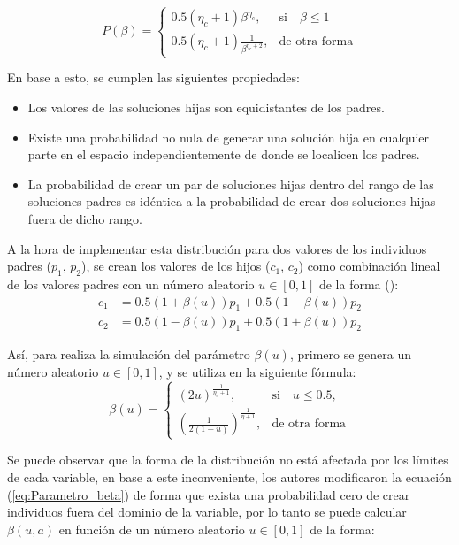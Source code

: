 \begin{equation}
    P(\beta)= 
\begin{cases}
     0.5(\eta_c + 1)\beta^{\eta_c},& \text{si} \quad \beta \leq 1\\
     0.5(\eta_c + 1) \frac{1}{\beta^{\eta_c + 2}} ,& \text{de otra forma}
\end{cases}
\end{equation}

En base a esto, se cumplen las siguientes propiedades:
\begin{itemize}
\item Los valores de las soluciones hijas son equidistantes de los padres.
\item Existe una probabilidad no nula de generar una solución hija en cualquier parte en el espacio independientemente de donde se localicen los padres.
\item La probabilidad de crear un par de soluciones hijas dentro del rango de las soluciones padres es idéntica a la probabilidad de crear dos soluciones hijas fuera de dicho rango.
\end{itemize}

A la hora de implementar esta distribución para dos valores de los individuos padres ($p_1$, $p_2$), se crean los valores  
de los hijos ($c_1$, $c_2$) como combinación lineal de los valores padres con un número aleatorio $u \in [0, 1]$ 
de la forma (\cite{Joel:SBX1994}):
\begin{equation} \label{eq:generar_ind}
\begin{split}
c_1 &= 0.5(1 + \beta(u))p_1 + 0.5(1 - \beta(u)) p_2 \\
c_2 &= 0.5(1 - \beta(u))p_1 + 0.5(1 + \beta(u)) p_2
\end{split}
\end{equation}

Así, para realiza la simulación del parámetro $\beta(u)$, primero se genera un número aleatorio $u \in [0, 1]$, y se utiliza 
en la siguiente fórmula:
\begin{equation} \label{eq:Parametro_beta}
    \beta(u)= 
\begin{cases}
     (2u)^{\frac{1}{\eta_c+1}},& \text{si} \quad u \leq 0.5,\\
     	(\frac{1}{2(1-u)})^{\frac{1}{\eta+1}} ,& \text{de otra forma}
\end{cases}
\end{equation}

Se puede observar que la forma de la distribución no está afectada por los límites de cada variable, en base a este inconveniente, 
los autores \cite{deb1999self} modificaron la ecuación (\ref{eq:Parametro_beta}) de forma que exista una probabilidad cero 
de crear individuos fuera del dominio de la variable, por lo tanto se puede calcular $\beta(u, a)$ en función de un número 
aleatorio $u \in [0,1]$ de la forma:


